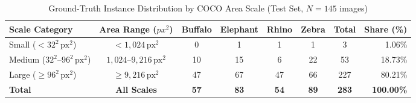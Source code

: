 \begin{table}[htbp]
\centering
\caption{Ground-Truth Instance Distribution by COCO Area Scale (Test Set, $N=145$ images)}
\label{tab:test_scale_distribution}
\begin{tabular}{lccccccr}
\toprule
\textbf{Scale Category} & \textbf{Area Range ($px^2$)} & \textbf{Buffalo} & \textbf{Elephant} & \textbf{Rhino} & \textbf{Zebra} & \textbf{Total} & \textbf{Share (\%)} \\
\midrule
Small ($<32^2\,\text{px}^2$) & $< 1{,}024\,\text{px}^2$ & 0 & 1 & 1 & 1 & 3 & 1.06\% \\
Medium ($32^2\text{--}96^2\,\text{px}^2$) & $1{,}024\text{--}9{,}216\,\text{px}^2$ & 10 & 15 & 6 & 22 & 53 & 18.73\% \\
Large ($\ge 96^2\,\text{px}^2$) & $\ge 9{,}216\,\text{px}^2$ & 47 & 67 & 47 & 66 & 227 & 80.21\% \\
\midrule
\textbf{Total} & \textbf{All Scales} & \textbf{57} & \textbf{83} & \textbf{54} & \textbf{89} & \textbf{283} & \textbf{100.00\%} \\
\bottomrule
\end{tabular}
\end{table}
